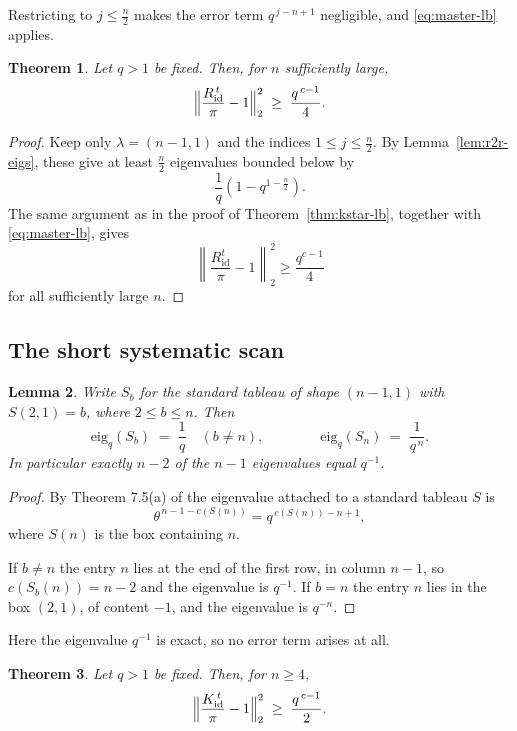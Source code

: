 \documentclass[11pt]{article}
\theoremstyle{plain}  %
\newtheorem{theorem}{Theorem}[section]
\newtheorem{lemma}[theorem]{Lemma}
\newcommand{\eig}{\text{eig}} %
\begin{document}
Restricting to $j \le \frac n2$ makes the error term $q^{\,j-n+1}$ negligible, and
\eqref{eq:master-lb} applies.

\begin{theorem}\label{thm:r2r-lb}
Let $q>1$ be fixed. Then, for $n$ sufficiently large,
$$
  \Bigl\|\frac{R^{\,t}_{\mathrm{id}}}{\pi}-1\Bigr\|_2^{2}
  \;\ge\; \frac{q^{\,c-1}}{4} .
$$
\end{theorem}




\begin{proof}
Keep only $\lambda=(n-1,1)$ and the indices
$1\leq j\leq \frac{n}{2}$. By Lemma~\ref{lem:r2r-eigs}, these give at least $\frac{n}{2}$
eigenvalues bounded below by
\[
\frac1q\left(1-q^{1-\frac{n}{2}}\right).
\]
The same argument as in the proof of Theorem~\ref{thm:kstar-lb}, together with
\eqref{eq:master-lb}, gives
\[
\left\|
\frac{R_{\mathrm{id}}^t}{\pi}-1
\right\|_2^2
\geq
\frac{q^{c-1}}{4}
\]
for all sufficiently large $n$.
\end{proof}

\bigskip

\subsection{The short systematic scan}



\begin{lemma}\label{lem:scan-eigs}
Write $S_b$ for the standard tableau of shape $(n-1,1)$ with $S(2,1) = b$,
where $2 \le b \le n$. Then
$$
  \eig_q(S_b) \;=\; \frac1q \quad (b \ne n),
  \qquad\qquad
  \eig_q(S_n) \;=\; \frac{1}{q^{\,n}} .
$$
In particular exactly $n-2$ of the $n-1$ eigenvalues equal $q^{-1}$.
\end{lemma}


\begin{proof}
By Theorem 7.5(a) of \cite{DiaconisRam2000} the eigenvalue attached to a
standard tableau $S$ is $$\theta^{\,n-1-c(S(n))} = q^{\,c(S(n))-n+1},$$ where
$S(n)$ is the box containing $n$.

If $b \ne n$ the entry $n$ lies at the end of the first row, in column $n-1$,
so $c(S_b(n)) = n-2$ and the eigenvalue is $q^{-1}$. If $b = n$ the entry $n$
lies in the box $(2,1)$, of content $-1$, and the eigenvalue is $q^{-n}$.
\end{proof}



Here the eigenvalue $q^{-1}$ is exact, so no error term arises at all.
\begin{theorem}\label{thm:scan-lb}
Let $q>1$ be fixed. Then, for $n \ge 4$,
$$
  \Bigl\|\frac{K^{\,t}_{\mathrm{id}}}{\pi}-1\Bigr\|_2^{2}
  \;\ge\; \frac{q^{\,c-1}}{2} .
$$
\end{theorem}
\end{document}
